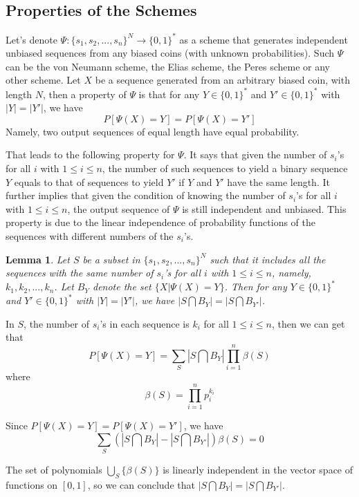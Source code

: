 \documentclass[journal]{IEEEtran}
\newtheorem{Lemma}[Theorem]{Lemma}
\begin{document}
\subsection{Properties of the Schemes}

Let's denote $\Psi: \{s_1,s_2,...,s_n\}^N \rightarrow \{0,1\}^*$ as a scheme that generates independent unbiased sequences from any biased coins (with unknown probabilities).
Such $\Psi$ can be the von Neumann scheme, the Elias scheme, the Peres scheme or any other scheme. Let $X$ be a sequence generated from an arbitrary biased coin, with length $N$, then
a property of $\Psi$ is that for any $Y\in \{0,1\}^*$ and $Y' \in \{0,1\}^*$ with $|Y|=|Y'|$, we have
$$P[\Psi(X)=Y]=P[\Psi(X)=Y']$$
Namely, two output sequences of equal length have equal probability.


That leads to the following property for $\Psi$. It says that given the number of $s_i$'s for all $i$ with $1\leq i\leq n$,
the number of such sequences to yield a binary sequence $Y$ equals to that of sequences to yield $Y'$ if
$Y$ and $Y'$ have the same length. It further implies that given the condition of knowing the number of $s_i$'s for all $i$ with $1\leq i\leq n$, the output sequence
of $\Psi$ is still independent and unbiased. This property is due to the
linear independence of probability functions of the sequences with different numbers
of the $s_i$'s.

\begin{Lemma}
Let $S$ be a subset in $\{s_1,s_2, ..., s_n\}^N$ such that it includes all the sequences with the same number of $s_i$'s for all $i$ with $1\leq i\leq n$, namely, $k_1, k_2, ..., k_n$. Let $B_Y$ denote the set $\{X|\Psi(X)=Y\}$. Then for any $Y\in \{0,1\}^*$ and $Y' \in \{0,1\}^*$ with $|Y|=|Y'|$, we have $|S\bigcap B_Y|=|S\bigcap B_{Y'}|$. \label{lemma_coin}
\end{Lemma}

\proof In $S$, the number of $s_i$'s in each sequence is $k_i$ for all $1\leq i\leq n$, then we can get that
$$P[\Psi(X)=Y]=\sum_S |S\bigcap B_Y|\prod_{i=1}^n \beta(S) $$
where
$$\beta(S)=\prod_{i=1}^n p_i^{k_i}$$

Since $P[\Psi(X)=Y]=P[\Psi(X)=Y']$, we have
$$\sum_S(|S\bigcap B_Y|-|S\bigcap B_{Y'}|)\beta(S)=0$$

The set of polynomials $\bigcup_{S}\{\beta(S)\}$ is linearly independent in the vector space of functions on $[0,1]$, so we can conclude that
$|S\bigcap B_Y|=|S\bigcap B_{Y'}|$.
\hfill\QED
\end{document}
